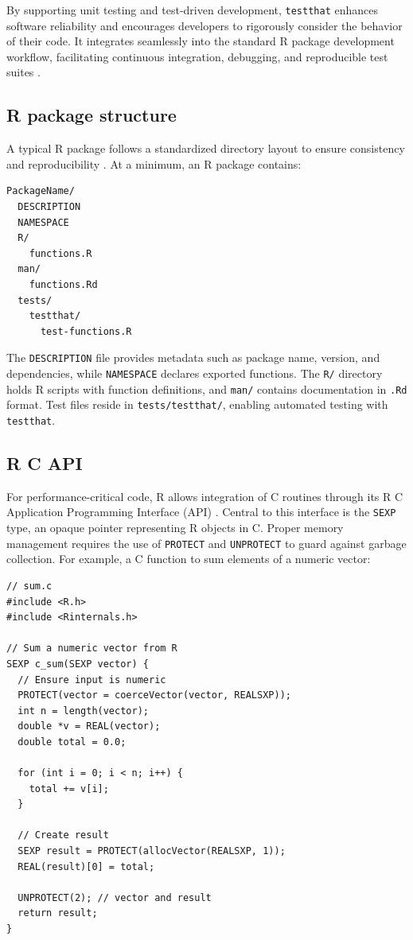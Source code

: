 By supporting unit testing and test-driven development, \texttt{testthat} enhances software reliability and encourages developers to rigorously consider the behavior of their code. It integrates seamlessly into the standard R package development workflow, facilitating continuous integration, debugging, and reproducible test suites \cite{wickham2015rpackages}.

\subsection{R package structure}

A typical R package follows a standardized directory layout to ensure consistency and reproducibility \cite{wickham2015rpackages}. At a minimum, an R package contains:

\begin{verbatim}
PackageName/
  DESCRIPTION
  NAMESPACE
  R/
    functions.R
  man/
    functions.Rd
  tests/
    testthat/
      test-functions.R
\end{verbatim}

The \texttt{DESCRIPTION} file provides metadata such as package name, version, and dependencies, while \texttt{NAMESPACE} declares exported functions. The \texttt{R/} directory holds R scripts with function definitions, and \texttt{man/} contains documentation in \texttt{.Rd} format. Test files reside in \texttt{tests/testthat/}, enabling automated testing with \texttt{testthat}.

\subsection{R C API}

For performance-critical code, R allows integration of C routines through its R C Application Programming Interface (API) \cite{rcore2024}. Central to this interface is the \texttt{SEXP} type, an opaque pointer representing R objects in C. Proper memory management requires the use of \texttt{PROTECT} and \texttt{UNPROTECT} to guard against garbage collection. For example, a C function to sum elements of a numeric vector:

\begin{verbatim}
// sum.c
#include <R.h>
#include <Rinternals.h>

// Sum a numeric vector from R
SEXP c_sum(SEXP vector) {
  // Ensure input is numeric
  PROTECT(vector = coerceVector(vector, REALSXP));
  int n = length(vector);
  double *v = REAL(vector);
  double total = 0.0;

  for (int i = 0; i < n; i++) {
    total += v[i];
  }

  // Create result
  SEXP result = PROTECT(allocVector(REALSXP, 1));
  REAL(result)[0] = total;

  UNPROTECT(2); // vector and result
  return result;
}
\end{verbatim}

